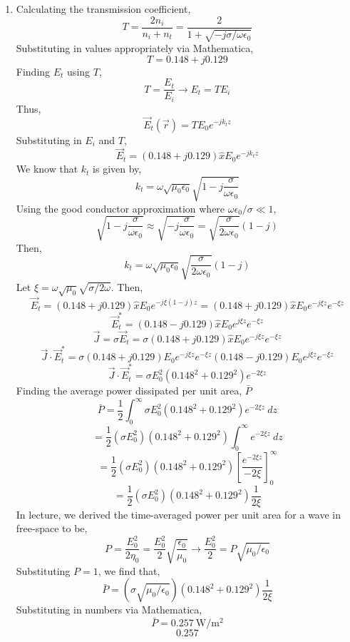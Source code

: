 \documentclass[12pt]{article}
\begin{document}
\begin{enumerate}
\begin{enumerate}
		\item [(c)]
		Calculating the transmission coefficient,
		\[T=\frac{2n_i}{n_i+n_t}=\frac{2}{1+\sqrt{-j\sigma/\omega\epsilon_0}}\]
		Substituting in values appropriately via Mathematica,
		\[T=0.148+j0.129\]
		Finding $E_t$ using $T$,
		\[T=\frac{E_t}{E_i}\to E_t=TE_i\]
		Thus,
		\[\vec E_t(\vec r)=TE_0e^{-jk_tz}\]
		Substituting in $E_i$ and $T$,
		\[\vec E_t=(0.148+j0.129)\hat xE_0e^{-jk_tz}\]
		We know that $k_t$ is given by,
		\[k_t = \omega\sqrt{\mu_0\epsilon_0}\sqrt{1-j\frac{\sigma}{\omega \epsilon_0}}\]
		Using the good conductor approximation where $\omega \epsilon_0/\sigma \ll 1$,
		\[\sqrt{1-j\frac{\sigma}{\omega\epsilon_0}} \approx\sqrt{-j\frac{\sigma}{\omega \epsilon_0}}=\sqrt{\frac{\sigma}{2\omega\epsilon_0}}(1-j)\]
		Then,
		\[k_t=\omega\sqrt{\mu_0\epsilon_0}\sqrt{\frac{\sigma}{2\omega \epsilon_0}}(1-j)\]
		Let $\xi=\omega\sqrt{\mu_0}\sqrt{\sigma/2\omega}$.
		Then,
		\[\vec E_t=(0.148+j0.129)\hat x E_0e^{-j\xi(1-j)z}=(0.148+j0.129)\hat x E_0e^{-j\xi z}e^{-\xi z}\]
		\[\vec E_t^* = (0.148-j0.129)\hat x E_0e^{j\xi z}e^{-\xi z}\]
		\[\vec J = \sigma \vec E_t =\sigma(0.148+j0.129)\hat xE_0e^{-j\xi z}e^{-\xi z}\]
		\[\vec J \cdot \vec E_t^* = \sigma(0.148+j0.129)E_0e^{-j\xi z}e^{-\xi z}(0.148-j0.129)E_0e^{j\xi z}e^{-\xi z}\]
		\[\vec J \cdot \vec E_t^*=\sigma E_0^2 (0.148^2+0.129^2)e^{-2\xi z}\]
		Finding the average power dissipated per unit area, $\bar P$
		\[\bar P= \frac{1}{2}\int_0^{\infty}\sigma E_0^2(0.148^2 + 0.129^2)e^{-2\xi z}\: dz\]
		\[=\frac{1}{2}(\sigma E_0^2)(0.148^2+0.129^2)\int_0^{\infty}e^{-2\xi z}\: dz\]
		\[=\frac{1}{2}(\sigma E_0^2)(0.148^2+0.129^2)\left[\frac{e^{-2\xi z}}{-2\xi}\right]_0^{\infty}\]
		\[=\frac{1}{2}(\sigma E_0^2)(0.148^2+0.129^2)\frac{1}{2\xi}\]
		In lecture, we derived the time-averaged power per unit area for a wave in free-space to be,
		\[P=\frac{E_0^2}{2\eta_0}=\frac{E_0^2}{2}\sqrt{\frac{\epsilon_0}{\mu_0}}\to \frac{E_0^2}{2}=P\sqrt{\mu_0/\epsilon_0}\]
		Substituting $P=1$, we find that,
		\[\bar P = \left(\sigma \sqrt{\mu_0/\epsilon_0}\right)(0.148^2+0.129^2)\frac{1}{2\xi}\]
		Substituting in numbers via Mathematica,
		\[\bar P = 0.257 \: \mathrm{W/m^2}\]
		\[\boxed{0.257}\]

	\end{enumerate}


\end{enumerate}
\end{document}
